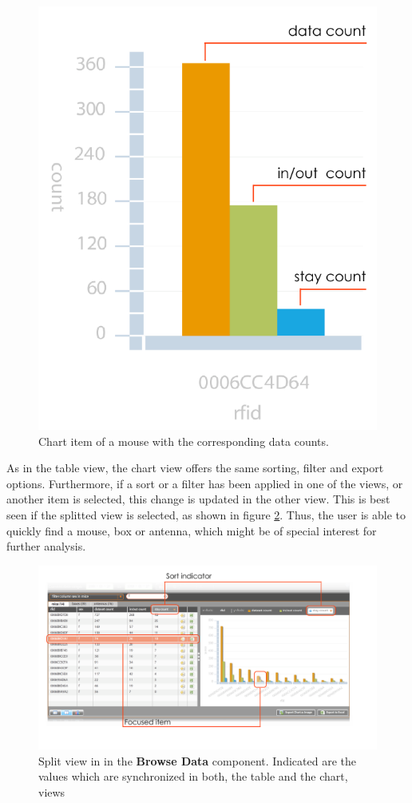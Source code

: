 \begin{figure}[htpb]
\begin{center}
  \includegraphics[width=.33\textwidth]{assets/pdf/mouse_chart_item.pdf}
  \caption[Chart item of a mouse]{Chart item of a mouse with the corresponding data counts.}
  \label{fig:mouse_chart_item}
\end{center}
\end{figure}


As in the table view, the chart view offers the same sorting, filter and export options. Furthermore, if a sort or a filter has been applied in one of the views, or another item is selected, this change is updated in the other view. This is best seen if the splitted view is selected, as shown in figure \ref{fig:table_chart_view}. Thus, the user is able to quickly find a mouse, box or antenna, which might be of special interest for further analysis.

\begin{figure}[htpb]
\begin{center}
  \includegraphics[width=\textwidth]{assets/pdf/table_chart_view.pdf}
  \caption[Split view]{Split view in in the \textbf{Browse Data} component. Indicated are the values which are synchronized in both, the table and the chart, views}
  \label{fig:table_chart_view}
\end{center}
\end{figure}

